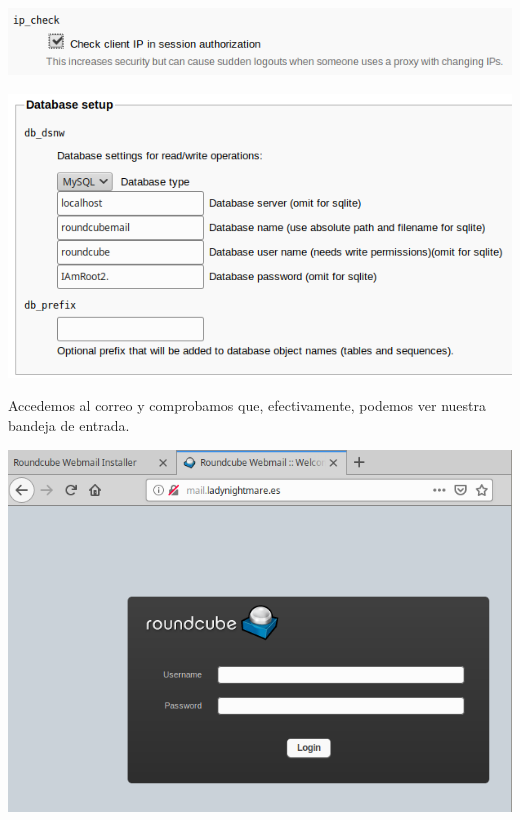 \documentclass{article}
\begin{document}
\begin{center}
\includegraphics[scale=0.6]{images/ipcheck.png}
\end{center}

\begin{center}
\includegraphics[scale=0.6]{images/db.png}
\end{center}

Accedemos al correo y comprobamos que, efectivamente, podemos ver nuestra bandeja de entrada.

\begin{center}
\includegraphics[scale=0.4]{images/final.png}
\end{center}
\end{document}
